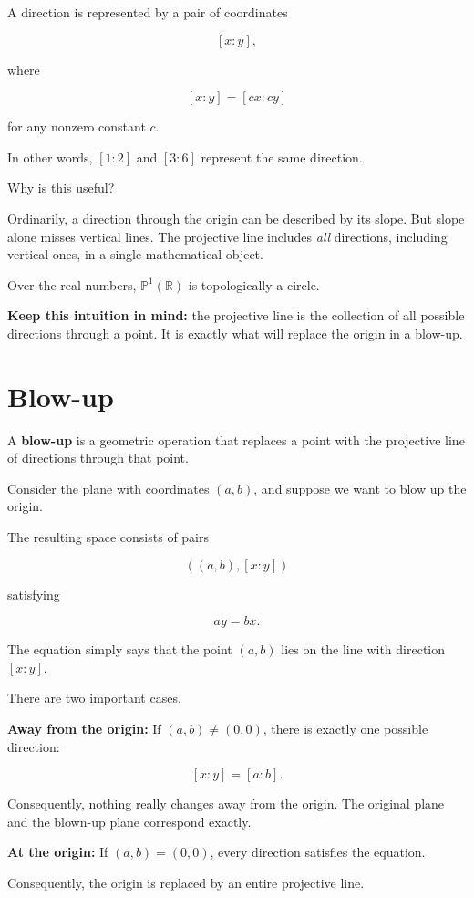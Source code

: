 \documentclass[12pt]{article}
\begin{document}
A direction is represented by a pair of coordinates

\[
[x:y],
\]

where

\[
[x:y]=[cx:cy]
\]

for any nonzero constant \(c\).

In other words, \([1:2]\) and \([3:6]\) represent the same direction.

Why is this useful?

Ordinarily, a direction through the origin can be described by its
slope. But slope alone misses vertical lines. The projective line
includes \emph{all} directions, including vertical ones, in a single
mathematical object.

Over the real numbers, \(\mathbb P^1(\mathbb R)\) is topologically a
circle.

\textbf{Keep this intuition in mind:} the projective line is the
collection of all possible directions through a point. It is exactly
what will replace the origin in a blow-up.

\newpage
\section{Blow-up}\label{blow-up}

A \textbf{blow-up} is a geometric operation that replaces a point with
the projective line of directions through that point.

Consider the plane with coordinates \((a,b)\), and suppose we want to
blow up the origin.

The resulting space consists of pairs

\[
((a,b),[x:y])
\]

satisfying

\[
ay=bx.
\]

The equation simply says that the point \((a,b)\) lies on the line with
direction \([x:y]\).

There are two important cases.

\textbf{Away from the origin:} If \((a,b)\neq(0,0)\), there is exactly
one possible direction:

\[
[x:y]=[a:b].
\]

Consequently, nothing really changes away from the origin. The original
plane and the blown-up plane correspond exactly.

\textbf{At the origin:} If \((a,b)=(0,0)\), every direction satisfies
the equation.

Consequently, the origin is replaced by an entire projective line.
\end{document}

